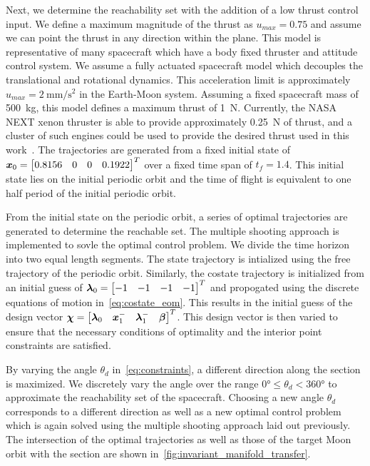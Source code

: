 \documentclass[smallcondensed]{svjour3}
\begin{document}
Next, we determine the reachability set with the addition of a low thrust control input.
We define a maximum magnitude of the thrust as \( u_{max} = 0.75 \) and assume we can point the thrust in any direction within the plane. 
This model is representative of many spacecraft which have a body fixed thruster and attitude control system.
We assume a fully actuated spacecraft model which decouples the translational and rotational dynamics.
This acceleration limit is approximately \( u_{max} = \SI{2}{\milli\meter\per\second\squared} \) in the Earth-Moon system.
Assuming a fixed spacecraft mass of \SI{500}{\kilo\gram}, this model defines a maximum thrust of \SI{1}{\newton}.
Currently, the NASA NEXT xenon thruster is able to provide approximately \SI{0.25}{\newton} of thrust, and a cluster of such engines could be used to provide the desired thrust used in this work~\cite{schmidt2008}.
The trajectories are generated from a fixed initial state of \( \bm{x}_0 = \begin{bmatrix}0.8156 & 0 & 0 & 0.1922 \end{bmatrix}^T \) over a fixed time span of \( t_f = 1.4 \).
This initial state lies on the initial periodic orbit and the time of flight is equivalent to one half period of the initial periodic orbit. 

From the initial state on the periodic orbit, a series of optimal trajectories are generated to determine the reachable set.
The multiple shooting approach is implemented to sovle the optimal control problem. 
We divide the time horizon into two equal length segments. 
The state trajectory is intialized using the free trajectory of the periodic orbit. 
Similarly, the costate trajectory is initialized from an initial guess of \( \bm{\lambda}_0 = \begin{bmatrix} -1 & -1 & -1 & -1\end{bmatrix}^T\) and propogated using the discrete equations of motion in~\cref{eq:costate_eom}.
This results in the initial guess of the design vector \( \bm{\chi} = \begin{bmatrix} \bm{\lambda}_0 & \bm{x}_1^{-} & \bm{\lambda}_1^{-} & \bm{\beta} \end{bmatrix}^T\).
This design vector is then varied to ensure that the necessary conditions of optimality and the interior point constraints are satisfied. 

By varying the angle \( \theta_d\) in~\cref{eq:constraints}, a different direction along the \Poincare section is maximized. 
We discretely vary the angle over the range \( \ang{0} \leq \theta_d < \ang{360} \) to approximate the reachability set of the spacecraft.
Choosing a new angle \( \theta_d \) corresponds to a different direction as well as a new optimal control problem which is again solved using the multiple shooting approach laid out previously.
The intersection of the optimal trajectories as well as those of the target Moon orbit with the \Poincare section are shown in~\cref{fig:invariant_manifold_transfer}.
\end{document}
